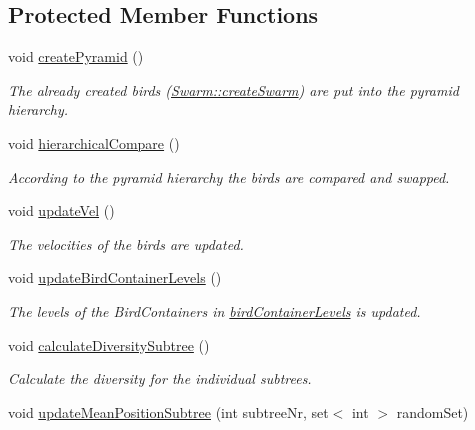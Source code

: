 \subsection*{Protected Member Functions}
\begin{CompactItemize}
\item 
void \hyperlink{classPyramidSwarm_23f4681fcd5ba0151ee4abc7c0143889}{createPyramid} ()
\begin{CompactList}\small\item\em The already created birds (\hyperlink{classSwarm_1ba247983a6f20d0e835c696748a530b}{Swarm::createSwarm}) are put into the pyramid hierarchy. \item\end{CompactList}\item 
void \hyperlink{classPyramidSwarm_cd664c6c7399497eeb45aeade60835ab}{hierarchicalCompare} ()
\begin{CompactList}\small\item\em According to the pyramid hierarchy the birds are compared and swapped. \item\end{CompactList}\item 
void \hyperlink{classPyramidSwarm_4f43e6459e6fede3785780facb4c5e1f}{updateVel} ()
\begin{CompactList}\small\item\em The velocities of the birds are updated. \item\end{CompactList}\item 
void \hyperlink{classPyramidSwarm_08b947b4263eb221c30271fe54f6ae33}{updateBirdContainerLevels} ()
\begin{CompactList}\small\item\em The levels of the BirdContainers in \hyperlink{classPyramidSwarm_d61fc84d8f5bdb25d1e008e181f695bb}{birdContainerLevels} is updated. \item\end{CompactList}\item 
void \hyperlink{classPyramidSwarm_41331a3f455fcbd596989f79715b1b8b}{calculateDiversitySubtree} ()
\begin{CompactList}\small\item\em Calculate the diversity for the individual subtrees. \item\end{CompactList}\item 
void \hyperlink{classPyramidSwarm_113cc1a3ee99a45c346fd3018a20ea7b}{updateMeanPositionSubtree} (int subtreeNr, set$<$ int $>$ randomSet)

\end{CompactItemize}
